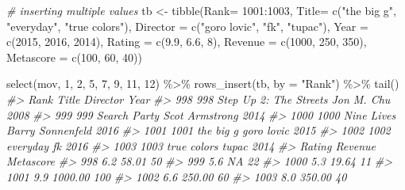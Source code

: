 \documentclass[
]{book}
\newenvironment{Shaded}{\begin{snugshade}}{\end{snugshade}}
\newcommand{\AttributeTok}[1]{\textcolor[rgb]{0.77,0.63,0.00}{#1}}
\newcommand{\CommentTok}[1]{\textcolor[rgb]{0.56,0.35,0.01}{\textit{#1}}}
\newcommand{\DecValTok}[1]{\textcolor[rgb]{0.00,0.00,0.81}{#1}}
\newcommand{\FloatTok}[1]{\textcolor[rgb]{0.00,0.00,0.81}{#1}}
\newcommand{\FunctionTok}[1]{\textcolor[rgb]{0.00,0.00,0.00}{#1}}
\newcommand{\NormalTok}[1]{#1}
\newcommand{\OtherTok}[1]{\textcolor[rgb]{0.56,0.35,0.01}{#1}}
\newcommand{\SpecialCharTok}[1]{\textcolor[rgb]{0.00,0.00,0.00}{#1}}
\newcommand{\StringTok}[1]{\textcolor[rgb]{0.31,0.60,0.02}{#1}}
\begin{document}
\begin{Shaded}
\begin{Highlighting}[]
\CommentTok{\# inserting multiple values}
\NormalTok{tb }\OtherTok{\textless{}{-}} 
  \FunctionTok{tibble}\NormalTok{(}\AttributeTok{Rank=} \DecValTok{1001}\SpecialCharTok{:}\DecValTok{1003}\NormalTok{,}
         \AttributeTok{Title=} \FunctionTok{c}\NormalTok{(}\StringTok{"the big g"}\NormalTok{, }\StringTok{"everyday"}\NormalTok{, }\StringTok{"true colors"}\NormalTok{), }
         \AttributeTok{Director =} \FunctionTok{c}\NormalTok{(}\StringTok{"goro lovic"}\NormalTok{, }\StringTok{"fk"}\NormalTok{, }\StringTok{"tupac"}\NormalTok{), }
         \AttributeTok{Year =} \FunctionTok{c}\NormalTok{(}\DecValTok{2015}\NormalTok{, }\DecValTok{2016}\NormalTok{, }\DecValTok{2014}\NormalTok{), }
         \AttributeTok{Rating =} \FunctionTok{c}\NormalTok{(}\FloatTok{9.9}\NormalTok{, }\FloatTok{6.6}\NormalTok{, }\DecValTok{8}\NormalTok{), }
         \AttributeTok{Revenue =} \FunctionTok{c}\NormalTok{(}\DecValTok{1000}\NormalTok{, }\DecValTok{250}\NormalTok{, }\DecValTok{350}\NormalTok{), }
         \AttributeTok{Metascore =} \FunctionTok{c}\NormalTok{(}\DecValTok{100}\NormalTok{, }\DecValTok{60}\NormalTok{, }\DecValTok{40}\NormalTok{))}

\FunctionTok{select}\NormalTok{(mov, }\DecValTok{1}\NormalTok{, }\DecValTok{2}\NormalTok{, }\DecValTok{5}\NormalTok{, }\DecValTok{7}\NormalTok{, }\DecValTok{9}\NormalTok{, }\DecValTok{11}\NormalTok{, }\DecValTok{12}\NormalTok{) }\SpecialCharTok{\%\textgreater{}\%}
  \FunctionTok{rows\_insert}\NormalTok{(tb, }\AttributeTok{by =} \StringTok{"Rank"}\NormalTok{) }\SpecialCharTok{\%\textgreater{}\%}
  \FunctionTok{tail}\NormalTok{()}
\CommentTok{\#\textgreater{}      Rank                  Title         Director Year}
\CommentTok{\#\textgreater{} 998   998 Step Up 2: The Streets       Jon M. Chu 2008}
\CommentTok{\#\textgreater{} 999   999           Search Party   Scot Armstrong 2014}
\CommentTok{\#\textgreater{} 1000 1000             Nine Lives Barry Sonnenfeld 2016}
\CommentTok{\#\textgreater{} 1001 1001              the big g       goro lovic 2015}
\CommentTok{\#\textgreater{} 1002 1002               everyday               fk 2016}
\CommentTok{\#\textgreater{} 1003 1003            true colors            tupac 2014}
\CommentTok{\#\textgreater{}      Rating Revenue Metascore}
\CommentTok{\#\textgreater{} 998     6.2   58.01        50}
\CommentTok{\#\textgreater{} 999     5.6      NA        22}
\CommentTok{\#\textgreater{} 1000    5.3   19.64        11}
\CommentTok{\#\textgreater{} 1001    9.9 1000.00       100}
\CommentTok{\#\textgreater{} 1002    6.6  250.00        60}
\CommentTok{\#\textgreater{} 1003    8.0  350.00        40}
\end{Highlighting}
\end{Shaded}
\end{document}
